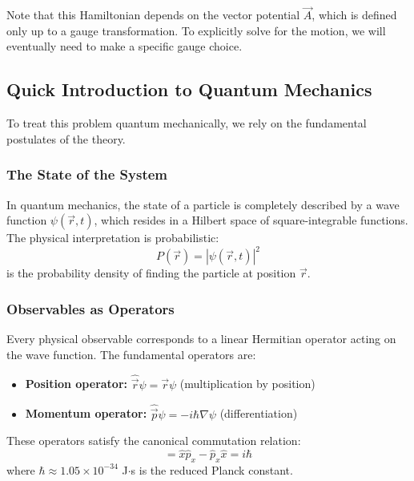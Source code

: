 \documentclass[11pt,a4paper]{article}
\let\oldsubsection\subsection
\renewcommand{\subsection}{\needspace{4\baselineskip}\oldsubsection}
\let\oldsubsubsection\subsubsection
\renewcommand{\subsubsection}{\needspace{3\baselineskip}\oldsubsubsection}
\theoremstyle{definition}
\theoremstyle{remark}
\begin{document}
Note that this Hamiltonian depends on the vector potential $\vec{A}$, which is defined only up to a gauge transformation. To explicitly solve for the motion, we will eventually need to make a specific gauge choice.

\subsection{Quick Introduction to Quantum Mechanics}

To treat this problem quantum mechanically, we rely on the fundamental postulates of the theory.

\subsubsection{The State of the System}

In quantum mechanics, the state of a particle is completely described by a wave function $\psi(\vec{r}, t)$, which resides in a Hilbert space of square-integrable functions. The physical interpretation is probabilistic:
\begin{equation}
    P(\vec{r}) = |\psi(\vec{r}, t)|^2
\end{equation}
is the probability density of finding the particle at position $\vec{r}$.

\subsubsection{Observables as Operators}

Every physical observable corresponds to a linear Hermitian operator acting on the wave function. The fundamental operators are:
\begin{itemize}
    \item \textbf{Position operator:} $\hat{\vec{r}} \psi = \vec{r} \psi$ (multiplication by position)
    \item \textbf{Momentum operator:} $\hat{\vec{p}} \psi = -i\hbar\nabla \psi$ (differentiation)
\end{itemize}
These operators satisfy the canonical commutation relation:
\begin{equation}
    [\hat{x}, \hat{p}_x] = \hat{x}\hat{p}_x - \hat{p}_x\hat{x} = i\hbar
\end{equation}
where $\hbar \approx 1.05 \times 10^{-34}$ J$\cdot$s is the reduced Planck constant.
\end{document}

